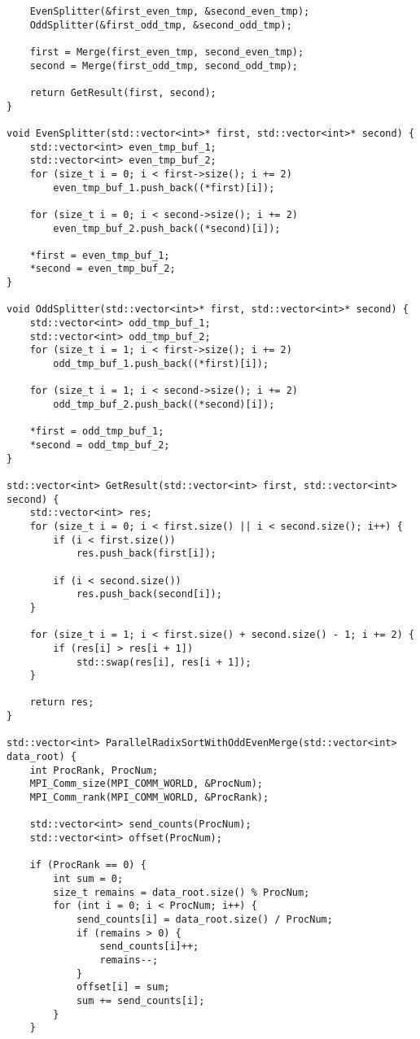 \documentclass[12pt]{report}
\begin{document}
\begin{lstlisting}
    EvenSplitter(&first_even_tmp, &second_even_tmp);
    OddSplitter(&first_odd_tmp, &second_odd_tmp);

    first = Merge(first_even_tmp, second_even_tmp);
    second = Merge(first_odd_tmp, second_odd_tmp);

    return GetResult(first, second);
}

void EvenSplitter(std::vector<int>* first, std::vector<int>* second) {
    std::vector<int> even_tmp_buf_1;
    std::vector<int> even_tmp_buf_2;
    for (size_t i = 0; i < first->size(); i += 2)
        even_tmp_buf_1.push_back((*first)[i]);

    for (size_t i = 0; i < second->size(); i += 2)
        even_tmp_buf_2.push_back((*second)[i]);

    *first = even_tmp_buf_1;
    *second = even_tmp_buf_2;
}

void OddSplitter(std::vector<int>* first, std::vector<int>* second) {
    std::vector<int> odd_tmp_buf_1;
    std::vector<int> odd_tmp_buf_2;
    for (size_t i = 1; i < first->size(); i += 2)
        odd_tmp_buf_1.push_back((*first)[i]);

    for (size_t i = 1; i < second->size(); i += 2)
        odd_tmp_buf_2.push_back((*second)[i]);

    *first = odd_tmp_buf_1;
    *second = odd_tmp_buf_2;
}

std::vector<int> GetResult(std::vector<int> first, std::vector<int> second) {
    std::vector<int> res;
    for (size_t i = 0; i < first.size() || i < second.size(); i++) {
        if (i < first.size())
            res.push_back(first[i]);

        if (i < second.size())
            res.push_back(second[i]);
    }

    for (size_t i = 1; i < first.size() + second.size() - 1; i += 2) {
        if (res[i] > res[i + 1])
            std::swap(res[i], res[i + 1]);
    }

    return res;
}

std::vector<int> ParallelRadixSortWithOddEvenMerge(std::vector<int> data_root) {
    int ProcRank, ProcNum;
    MPI_Comm_size(MPI_COMM_WORLD, &ProcNum);
    MPI_Comm_rank(MPI_COMM_WORLD, &ProcRank);

    std::vector<int> send_counts(ProcNum);
    std::vector<int> offset(ProcNum);

    if (ProcRank == 0) {
        int sum = 0;
        size_t remains = data_root.size() % ProcNum;
        for (int i = 0; i < ProcNum; i++) {
            send_counts[i] = data_root.size() / ProcNum;
            if (remains > 0) {
                send_counts[i]++;
                remains--;
            }
            offset[i] = sum;
            sum += send_counts[i];
        }
    }


\end{lstlisting}
\end{document}
